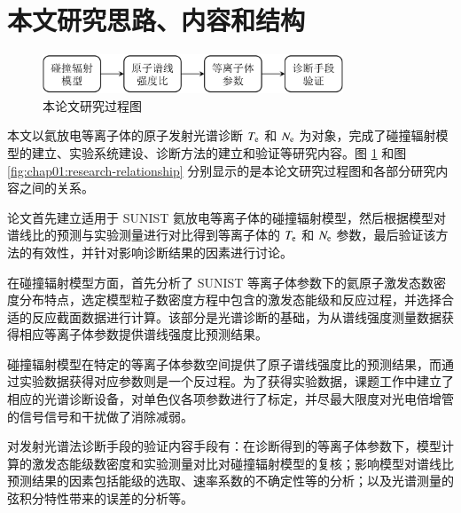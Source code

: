 \section{本文研究思路、内容和结构}

\begin{figure}%
  \centering
  \includegraphics[width=0.8\textwidth]{research-progress.pdf}
  \caption{本论文研究过程图}
  \label{fig:chap01:research-progress}
\end{figure}

本文以氦放电等离子体的原子发射光谱诊断 $T_{\rm e}$ 和 $N_{\rm e}$ 为对象，完成了碰撞辐射模型的建立、实验系统建设、诊断方法的建立和验证等研究内容。图 \ref{fig:chap01:research-progress} 和图 \ref{fig:chap01:research-relationship} 分别显示的是本论文研究过程图和各部分研究内容之间的关系。

论文首先建立适用于 SUNIST 氦放电等离子体的碰撞辐射模型，然后根据模型对谱线比的预测与实验测量进行对比得到等离子体的 $T_{\rm e}$ 和 $N_{\rm e}$ 参数，最后验证该方法的有效性，并针对影响诊断结果的因素进行讨论。

在碰撞辐射模型方面，首先分析了 SUNIST 等离子体参数下的氦原子激发态数密度分布特点，选定模型粒子数密度方程中包含的激发态能级和反应过程，并选择合适的反应截面数据进行计算。该部分是光谱诊断的基础，为从谱线强度测量数据获得相应等离子体参数提供谱线强度比预测结果。

碰撞辐射模型在特定的等离子体参数空间提供了原子谱线强度比的预测结果，而通过实验数据获得对应参数则是一个反过程。为了获得实验数据，课题工作中建立了相应的光谱诊断设备，对单色仪各项参数进行了标定，并尽最大限度对光电倍增管的信号信号和干扰做了消除减弱。%

对发射光谱法诊断手段的验证内容手段有：在诊断得到的等离子体参数下，模型计算的激发态能级数密度和实验测量对比对碰撞辐射模型的复核；影响模型对谱线比预测结果的因素\pozhehao 包括能级的选取、速率系数的不确定性等\pozhehao 的分析；以及光谱测量的弦积分特性带来的误差的分析等。


